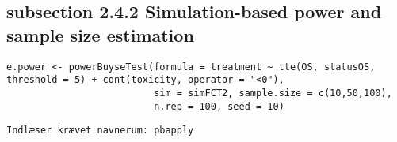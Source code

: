 \documentclass[12pt]{article}
\begin{document}
\subsection{subsection 2.4.2 Simulation-based power and sample size estimation}
\label{sec:orgd05c6d9}

\lstset{language=r,label= ,caption= ,captionpos=b,numbers=none}
\begin{lstlisting}
e.power <- powerBuyseTest(formula = treatment ~ tte(OS, statusOS, threshold = 5) + cont(toxicity, operator = "<0"),
                          sim = simFCT2, sample.size = c(10,50,100),
                          n.rep = 100, seed = 10)
\end{lstlisting}

\begin{verbatim}
Indlæser krævet navnerum: pbapply


\end{verbatim}
\end{document}
